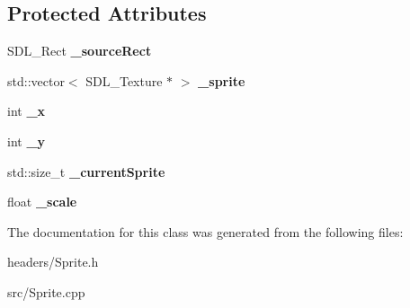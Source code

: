 \subsection*{Protected Attributes}
\begin{DoxyCompactItemize}
\item 
\hypertarget{class_sprite_a686dd5e0dda6797eae9d5f6716743f9d}{}\label{class_sprite_a686dd5e0dda6797eae9d5f6716743f9d} 
S\+D\+L\+\_\+\+Rect {\bfseries \+\_\+source\+Rect}
\item 
\hypertarget{class_sprite_a78aa41a9424d9e10cc387558d5ead4b7}{}\label{class_sprite_a78aa41a9424d9e10cc387558d5ead4b7} 
std\+::vector$<$ S\+D\+L\+\_\+\+Texture $\ast$ $>$ {\bfseries \+\_\+sprite}
\item 
\hypertarget{class_sprite_a46db40315cf64572f3d522faae635d40}{}\label{class_sprite_a46db40315cf64572f3d522faae635d40} 
int {\bfseries \+\_\+x}
\item 
\hypertarget{class_sprite_a2f46fb7e943d7acb1bd78fc2079e15b1}{}\label{class_sprite_a2f46fb7e943d7acb1bd78fc2079e15b1} 
int {\bfseries \+\_\+y}
\item 
\hypertarget{class_sprite_ad1b702bcc7393f3a1b4a6bb1b4ef9a66}{}\label{class_sprite_ad1b702bcc7393f3a1b4a6bb1b4ef9a66} 
std\+::size\+\_\+t {\bfseries \+\_\+current\+Sprite}
\item 
\hypertarget{class_sprite_ae5d2ffe975a64c83eb0b147a2870f347}{}\label{class_sprite_ae5d2ffe975a64c83eb0b147a2870f347} 
float {\bfseries \+\_\+scale}
\end{DoxyCompactItemize}


The documentation for this class was generated from the following files\+:\begin{DoxyCompactItemize}
\item 
headers/Sprite.\+h\item 
src/Sprite.\+cpp\end{DoxyCompactItemize}

